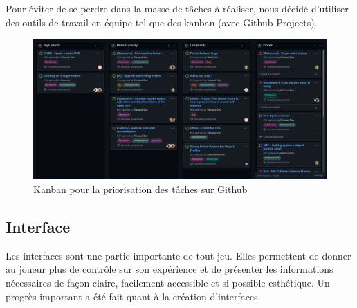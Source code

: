 \documentclass[french, 12pt]{article}
\begin{document}
    Pour éviter de se perdre dans la masse de tâches à réaliser, nous décidé d'utiliser des
    outils de travail en équipe tel que des kanban (avec Github Projects).\\
    

    \begin{figure}[hbt!]
        \centering
        \includegraphics[scale=0.28]{kanban.png}
        \caption{Kanban pour la priorisation des tâches sur Github}
    \end{figure}


    
    
    \newpage

    
    \newpage


    

    \newpage
    \subsection{Interface}
    
    Les interfaces sont une partie importante de tout jeu. Elles permettent de donner au joueur plus de contrôle sur son expérience et de présenter les informations nécessaires de façon claire, facilement accessible et si possible esthétique. Un progrès important a été fait quant à la création d'interfaces.
\end{document}
